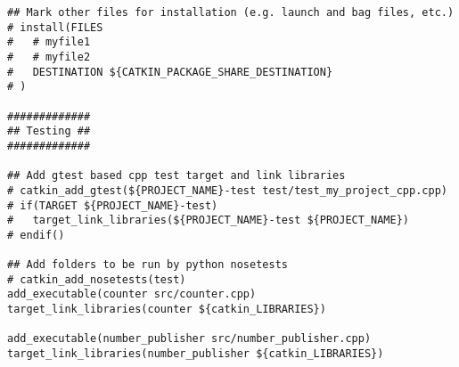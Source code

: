 \documentclass[letterpaper]{article}
\begin{document}
\begin{lstlisting}[style=xmlstyle, title=src/my\_project\_cpp/CMakeLists.txt]
## Mark other files for installation (e.g. launch and bag files, etc.)
# install(FILES
#   # myfile1
#   # myfile2
#   DESTINATION ${CATKIN_PACKAGE_SHARE_DESTINATION}
# )

#############
## Testing ##
#############

## Add gtest based cpp test target and link libraries
# catkin_add_gtest(${PROJECT_NAME}-test test/test_my_project_cpp.cpp)
# if(TARGET ${PROJECT_NAME}-test)
#   target_link_libraries(${PROJECT_NAME}-test ${PROJECT_NAME})
# endif()

## Add folders to be run by python nosetests
# catkin_add_nosetests(test)
add_executable(counter src/counter.cpp)
target_link_libraries(counter ${catkin_LIBRARIES})

add_executable(number_publisher src/number_publisher.cpp)
target_link_libraries(number_publisher ${catkin_LIBRARIES})
\end{lstlisting}
\end{document}
